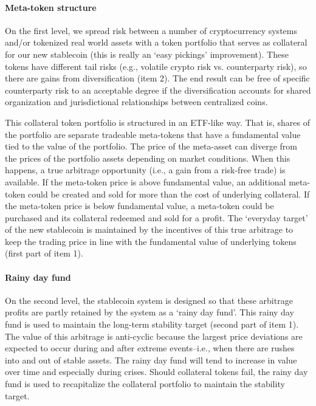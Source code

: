 \documentclass[10pt]{article}
\begin{document}
\paragraph{Meta-token structure}
On the first level, we spread risk between a number of cryptocurrency systems and/or tokenized real world assets with a token portfolio that serves as collateral for our new stablecoin (this is really an `easy pickings' improvement). These tokens have different tail risks (e.g., volatile crypto risk vs. counterparty risk), so there are gains from diversification (item 2). The end result can be free of specific counterparty risk to an acceptable degree if the diversification accounts for shared organization and jurisdictional relationships between centralized coins.

This collateral token portfolio is structured in an ETF-like way. That is, shares of the portfolio are separate tradeable meta-tokens that have a fundamental value tied to the value of the portfolio. The price of the meta-asset can diverge from the prices of the portfolio assets depending on market conditions. When this happens, a true arbitrage opportunity (i.e., a gain from a risk-free trade) is available. If the meta-token price is above fundamental value, an additional meta-token could be created and sold for more than the cost of underlying collateral. If the meta-token price is below fundamental value, a meta-token could be purchased and its collateral redeemed and sold for a profit. The `everyday target' of the new stablecoin is maintained by the incentives of this true arbitrage to keep the trading price in line with the fundamental value of underlying tokens (first part of item 1).

\paragraph{Rainy day fund}
On the second level, the stablecoin system is designed so that these arbitrage profits are partly retained by the system as a `rainy day fund'. This rainy day fund is used to maintain the long-term stability target (second part of item 1). The value of this arbitrage is anti-cyclic because the largest price deviations are expected to occur during and after extreme events--i.e., when there are rushes into and out of stable assets. The rainy day fund will tend to increase in value over time and especially during crises. Should collateral tokens fail, the rainy day fund is used to recapitalize the collateral portfolio to maintain the stability target.
\end{document}

